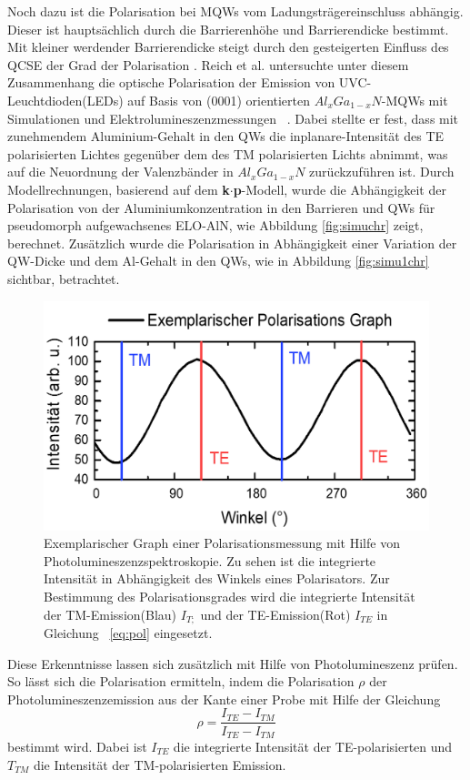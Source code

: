 Noch dazu ist die Polarisation bei MQWs vom Ladungsträgereinschluss abhängig. Dieser ist hauptsächlich durch die Barrierenhöhe und Barrierendicke bestimmt. Mit kleiner werdender Barrierendicke steigt durch den gesteigerten Einfluss des QCSE der Grad der Polarisation \cite{PhysRevB.84.035305}. 
\newline
Reich et al. untersuchte unter diesem Zusammenhang die optische Polarisation der Emission von UVC-Leuchtdioden(LEDs) auf Basis von (0001) orientierten $Al_{x}Ga_{1-x}N$-MQWs mit Simulationen und Elektrolumineszenzmessungen ~\cite{doi:10.1063/1.4932651}. Dabei stellte er fest, dass mit zunehmendem Aluminium-Gehalt in den QWs die inplanare-Intensität des TE polarisierten Lichtes gegenüber dem des TM polarisierten Lichts abnimmt, was auf die Neuordnung der Valenzbänder in $Al_{x}Ga_{1-x}N$ zurückzuführen ist. 
\newline
Durch Modellrechnungen, basierend auf dem  \textbf{k$\cdot$p}-Modell, wurde die Abhängigkeit der Polarisation von der Aluminiumkonzentration in den Barrieren und QWs für pseudomorph aufgewachsenes ELO-AlN, wie Abbildung \ref{fig:simuchr} zeigt, berechnet. Zusätzlich wurde die Polarisation in Abhängigkeit einer Variation der QW-Dicke und dem Al-Gehalt in den QWs, wie in Abbildung \ref{fig:simu1chr} sichtbar, betrachtet.
\begin{figure}[ht!]
  \centering
  \begin{minipage}{\linewidth}
      \centering
      \includegraphics[width=0.6\linewidth]{Bilder/exemplPolGraph.png}
      \caption{Exemplarischer Graph einer Polarisationsmessung mit Hilfe von Photolumineszenzspektroskopie. Zu sehen ist die integrierte Intensität in Abhängigkeit des Winkels eines Polarisators. Zur Bestimmung des Polarisationsgrades wird die integrierte Intensität der TM-Emission(Blau) $I_{T;}$  und der TE-Emission(Rot) $I_{TE}$ in Gleichung ~\ref{eq:pol} eingesetzt.}
      \label{fig:degra}
  \end{minipage}
\end{figure}
Diese Erkenntnisse lassen sich zusätzlich mit Hilfe von Photolumineszenz prüfen. So lässt sich die Polarisation ermitteln, indem die Polarisation $\rho$ der Photolumineszenzemission aus der Kante einer Probe mit Hilfe der Gleichung 
\begin{equation}
\rho = \frac{ I_{TE} - I_{TM} }{ I_{TE} - I_{TM} } 
\label{eq:pol}
\end{equation}
bestimmt wird. Dabei ist $I_{TE}$ die integrierte Intensität der TE-polarisierten und $T_{TM}$ die Intensität der TM-polarisierten Emission. 
 


